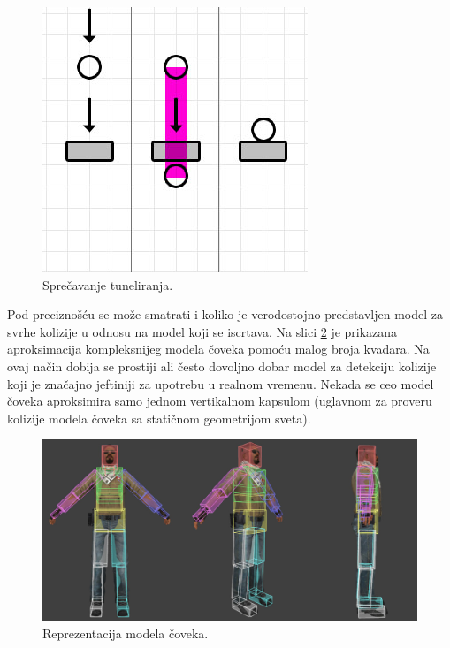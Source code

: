 \documentclass[12pt,oneside]{memoir}
\begin{document}
\begin{figure}[h!]
	\begin{center}
	\includegraphics[scale=0.55]{tunnel_fixed.png}
	\end{center}
	\caption{Sprečavanje tuneliranja.}
	\label{fig:tunnel_fix}
\end{figure}

Pod preciznošću se može smatrati i koliko je verodostojno predstavljen model za svrhe kolizije u odnosu 
na model koji se iscrtava.
Na slici \ref{fig:hitbox} je prikazana aproksimacija kompleksnijeg modela čoveka pomoću malog broja kvadara.
Na ovaj način dobija se prostiji ali često dovoljno dobar model za detekciju kolizije koji je značajno 
jeftiniji za upotrebu u realnom vremenu. 
Nekada se ceo model čoveka aproksimira samo jednom vertikalnom kapsulom
(uglavnom za proveru kolizije modela čoveka sa statičnom geometrijom sveta). 

\begin{figure}[h!]
	\begin{center}
	\includegraphics[scale=0.55]{hitbox.png}
	\end{center}
	\caption{Reprezentacija modela čoveka.}
	\label{fig:hitbox}
\end{figure}
\end{document}
